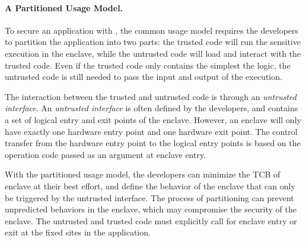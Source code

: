 \paragraph{A Partitioned Usage Model.}
To secure an application with \sgx{},
the common usage model requires the developers to partition the application into two parts:
the trusted code will run the sensitive execution in the enclave,
while the untrusted code will load and interact with the trusted code.
Even if the trusted code only contains the simplest the logic,
the untrusted code is still needed to pass the input and output of the execution.

The interaction between the trusted and untrusted code is through an {\em untrusted interface}.
An {\em untrusted interface} is often defined by the developers, and contains a set of logical entry and exit points of the enclave.
However, an enclave will only have exactly one hardware entry point and one hardware exit point.
The control transfer from the hardware entry point to the logical entry points
is based on the operation code passed as an argument at enclave entry.

With the partitioned usage model,
the developers can minimize the TCB of enclave at their best effort,
and define the behavior of the enclave that can only be triggered by the untrusted interface.
The process of partitioning can prevent unpredicted behaviors in the enclave,
which may compromise the security of the enclave.
The untrusted and trusted code must explicitly call for enclave entry or exit
at the fixed sites in the application.






